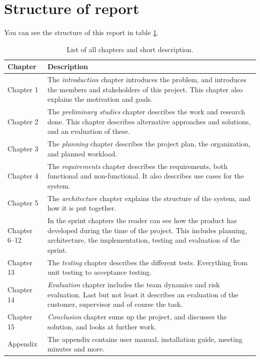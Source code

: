 \section{Structure of report}
You can see the structure of this report in table \ref{tab:structure_of_report}.
\begin{table}[!ht]\centering
\caption{List of all chapters and short description. }
\label{tab:structure_of_report}
\def\arraystretch{1.3}
\begin{tabularx}{\textwidth}{lX} \toprule[0.5mm]
\textbf{Chapter} & \textbf{Description} \\ \midrule
Chapter 1 & The \emph{introduction} chapter introduces the problem, and introduces the members and stakeholders of this project.
This chapter also explains the motivation and goals. \\

Chapter 2 &  The \emph{preliminary studies} chapter describes the work and research done. This chapter describes alternative approaches and solutions, and an evaluation of these. \\

Chapter 3 &  The \emph{planning} chapter describes the project plan, the organization, and planned workload.  \\

Chapter 4 &  The \emph{requirements} chapter describes the requirements, both functional and non-functional. It also describes use cases for the system. \\

Chapter 5	 &  The \emph{architecture} chapter explains the structure of the system, and how it is put together. \\

Chapter 6--12 	&  In the sprint chapters the reader can see how the product has developed during the time of the project. This includes planning, architecture, the implementation, testing and evaluation of the sprint. \\

Chapter 13 	 &  The \emph{testing} chapter describes the different tests. Everything from unit testing to acceptance testing. \\

Chapter 14 	 &  \emph{Evaluation} chapter includes the team dynamics and risk evaluation. Last but not least it describes an evaluation of the customer, supervisor and of course the task. \\

Chapter 15 	 &  \emph{Conclusion} chapter sums up the project, and discusses the solution, and looks at further work. \\

\midrule
Appendix 	 &   The appendix contains user manual, installation guide, meeting minutes and more.\\

\bottomrule[0.5mm]
\end{tabularx}
\end{table}

